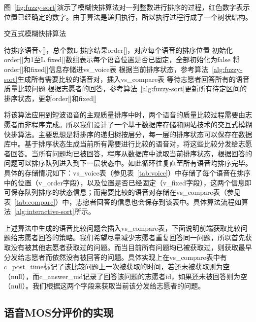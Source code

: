 图~\ref{fig:fuzzy-sort}演示了模糊快排算法对一列整数进行排序的过程，红色数字表示位置已经确定的数字。由于算法是递归执行，所以执行过程行成了一个树状结构。

\begin{algorithm}
    \caption{交互式模糊快排算法}
    \label{alg:interactive-sort}
\begin{algorithmic}[1]
\INPUT
    \Statex 待排序语音v[]，总个数L
\OUTPUT
    \Statex 排序结果order[]，对应每个语音的排序位置
\State 初始化order[]为1至L
\State fixed[]数组表示每个语音位置是否已固定，全部初始化为false
    \State 将order[]和fixed[]信息存储进vs\_voice表
    \State 根据当前排序状态，参考算法~\ref{alg:fuzzy-sort}生成所有需要比较的语音对，插入vs\_compare表
    \State 等待志愿者回答所有的语音质量比较问题
    \State 根据志愿者的回答，参考算法~\ref{alg:fuzzy-sort}更新所有待定区间的排序状态，更新order[]和fixed[]
\EndWhile
\end{algorithmic}
\end{algorithm}

将该算法应用到短波语音的主观质量排序中时，两个语音的质量比较过程需要由志愿者而非程序完成。所以我们设计了一个基于数据库存储和网站技术的交互式模糊快排算法。主要思想是将排序的递归树按层分，每一层的排序状态可以保存在数据库中。基于排序状态生成当前所有需要进行比较的语音对，将这些比较分发给志愿者回答。当所有问题均已被回答，程序从数据库中读取当前排序状态，根据回答的问题可以排序队列进入到下一层状态中。如此循环往复直至所有语音均排序完毕。具体的存储情况如下：vs\_voice表（参见表~\ref{tab:voice}）中存储了每个语音在排序中的位置（v\_order字段），以及位置是否已经固定（v\_fixed字段），这两个信息即可保存队列排序的状态信息；而需要比较的语音对存储在vs\_compare表（参见表~\ref{tab:compare}）中，志愿者回答的信息也会保存到该表中。具体算法流程如算法~\ref{alg:interactive-sort}所示。

上述算法中生成的语音比较问题会插入vs\_compare表，下面说明前端获取比较问题给志愿者回答的策略。我们希望尽量减少志愿者重复回答同一问题，所以首先获取没有被其他志愿者获取过的问题。而当目前所有问题均已被获取过，则获取最早分发给志愿者而依然没有被回答的问题。具体实现上在vs\_compare表中有c\_post\_time标记了该比较问题上一次被获取的时间，若还未被获取则为空（null），而c\_answer\_uid记录了回答该问题的志愿者id，如果还未被回答则为空（null）。我们根据这两个字段来获取当前该分发给志愿者的问题。

\subsection{语音MOS分评价的实现}

